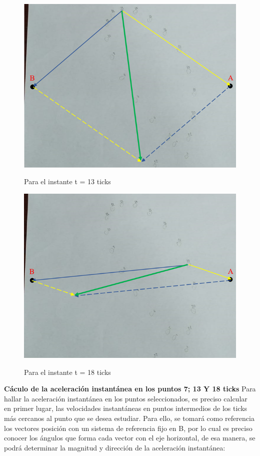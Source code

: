 \documentclass[../main.tex]{subfiles}
\begin{document}
\begin{figure}[H]
    \centering
    \includegraphics[width=0.8\linewidth]{images/calc5.png}
    \label{ref:calc5}
    \caption{Para el instante t = 13 ticks}
\end{figure}
\begin{figure}[H]
    \centering
    \includegraphics[width=0.8\linewidth]{images/calc6.png}
    \label{ref:calc6}
    \caption{Para el instante t = 18 ticks}
\end{figure}

\textbf{Cáculo de la aceleración instantánea en los puntos 7; 13 Y 18 ticks}
Para hallar la aceleración instantánea en los puntos seleccionados, es preciso
calcular en primer lugar, las velocidades instantáneas en puntos intermedios de
los ticks más cercanos al punto que se desea estudiar. Para ello, se tomará como 
referencia los vectores posición con un sistema de referencia fijo en B,
 por lo cual es preciso conocer los ángulos que forma cada vector con el 
 eje horizontal, de esa manera, se podrá determinar la magnitud y dirección
  de la aceleración instantánea:
\end{document}
